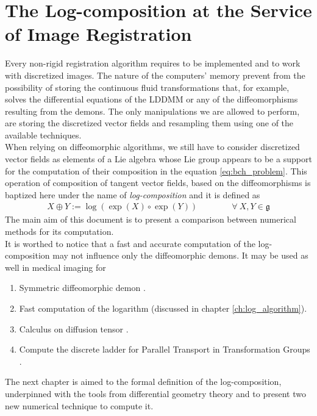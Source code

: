 \section{The Log-composition at the Service of Image Registration}

Every non-rigid registration algorithm requires to be implemented and to work with discretized images.
The nature of the computers' memory prevent from the possibility of storing the continuous fluid transformations that, for example, solves the differential equations of the LDDMM or any of the diffeomorphisms resulting from the demons. The only manipulations we are allowed to perform, are storing the discretized vector fields and resampling them using one of the available techniques.\\
When relying on diffeomorphic algorithms, we still have to consider discretized vector fields as elements of a Lie algebra whose Lie group appears to be a support for the computation of their composition in the equation \ref{eq:bch_problem}.
This operation of composition of tangent vector fields, based on the diffeomorphisms is baptized here under the name of \emph{log-composition} and it is defined as
\begin{align*}
X \oplus Y := \log(\exp(X)\circ\exp( Y))
\qquad \qquad
\forall ~X, Y \in \mathfrak{g}
\end{align*}
The main aim of this document is to present a comparison between numerical methods for its computation. \\

It is worthed to notice that a fast and accurate computation of the log-composition may not influence only the diffeomorphic demons. It may be used as well in medical imaging for
\begin{enumerate}
	\item Symmetric diffeomorphic demon \cite{vercauteren08}.
	\item Fast computation of the logarithm \cite{Bossa:08} (discussed in chapter \ref{ch:log_algorithm}).
	\item Calculus on diffusion tensor \cite{Arsigny:MRM:06}. 
	\item Compute the discrete ladder for Parallel Transport in Transformation Groups \cite{Lorenzi:discrete_ladders:14}.
\end{enumerate}	
	
The next chapter is aimed to the formal definition of the log-composition, underpinned with the tools from differential geometry theory and to present two new numerical technique to compute it.


